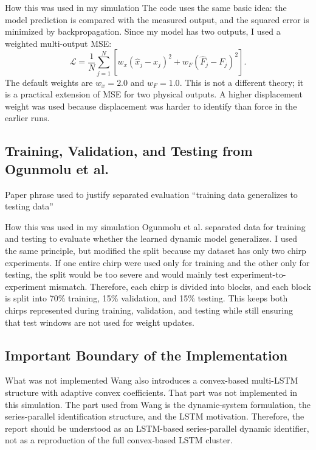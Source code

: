 \documentclass[11pt]{article}
\begin{document}
\begin{implementationbox}{How this was used in my simulation}
The code uses the same basic idea: the model prediction is compared with the measured output, and the squared error is minimized by backpropagation. Since my model has two outputs, I used a weighted multi-output MSE:
\begin{equation}
\mathcal{L}=\frac{1}{N}\sum_{j=1}^{N}\left[w_x\left(\hat{x}_j-x_j\right)^2+w_F\left(\hat{F}_j-F_j\right)^2\right].
\end{equation}
The default weights are $w_x=2.0$ and $w_F=1.0$. This is not a different theory; it is a practical extension of MSE for two physical outputs. A higher displacement weight was used because displacement was harder to identify than force in the earlier runs.
\end{implementationbox}

\subsection{Training, Validation, and Testing from Ogunmolu et al.}
\begin{paperbox}{Paper phrase used to justify separated evaluation \cite{ogunmolu2016}}
\centering
``training data generalizes to testing data''
\end{paperbox}

\begin{implementationbox}{How this was used in my simulation}
Ogunmolu et al. separated data for training and testing to evaluate whether the learned dynamic model generalizes. I used the same principle, but modified the split because my dataset has only two chirp experiments. If one entire chirp were used only for training and the other only for testing, the split would be too severe and would mainly test experiment-to-experiment mismatch. Therefore, each chirp is divided into blocks, and each block is split into 70\% training, 15\% validation, and 15\% testing. This keeps both chirps represented during training, validation, and testing while still ensuring that test windows are not used for weight updates.
\end{implementationbox}

\subsection{Important Boundary of the Implementation}
\begin{implementationbox}{What was not implemented}
Wang also introduces a convex-based multi-LSTM structure with adaptive convex coefficients. That part was not implemented in this simulation. The part used from Wang is the dynamic-system formulation, the series-parallel identification structure, and the LSTM motivation. Therefore, the report should be understood as an LSTM-based series-parallel dynamic identifier, not as a reproduction of the full convex-based LSTM cluster.
\end{implementationbox}
\end{document}
